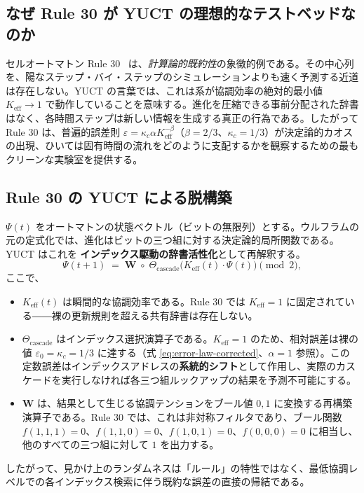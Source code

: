 \documentclass[11pt,a4paper]{article}
\newcommand{\Keff}{K_{\mathrm{eff}}}
\begin{document}
	\subsection{なぜ Rule 30 が YUCT の理想的なテストベッドなのか}
	セルオートマトン Rule 30~\cite{Wolfram2002} は、\textit{計算論的既約性}の象徴的例である。その中心列を、陽なステップ・バイ・ステップのシミュレーションよりも速く予測する近道は存在しない。YUCT の言葉では、これは系が協調効率の絶対的最小値 \(\Keff \to 1\) で動作していることを意味する。進化を圧縮できる事前分配された辞書はなく、各時間ステップは新しい情報を生成する真正の行為である。したがって Rule 30 は、普遍的誤差則 \(\varepsilon = \kappa_c \alpha \Keff^{-\beta}\)（\(\beta=2/3\)、\(\kappa_c=1/3\)）が決定論的カオスの出現、ひいては固有時間の流れをどのように支配するかを観察するための最もクリーンな実験室を提供する。
	
	\subsection{Rule 30 の YUCT による脱構築}
	\label{subsec:deconstruction}
	
	\(\Psi(t)\) をオートマトンの状態ベクトル（ビットの無限列）とする。ウルフラムの元の定式化では、進化はビットの三つ組に対する決定論的局所関数である。YUCT はこれを \textbf{インデックス駆動の辞書活性化}として再解釈する。
	\begin{equation}
		\Psi(t+1) \;=\; \mathbf{W}\;\circ\;
		\Theta_{\mathrm{cascade}}\!\bigl(\Keff(t)\cdot\Psi(t)\bigr)
		\pmod{2},
		\label{eq:rule30-ypsdc}
	\end{equation}
	ここで、
	\begin{itemize}
		\item \(\Keff(t)\) は瞬間的な協調効率である。Rule 30 では \(\Keff = 1\) に固定されている――裸の更新規則を超える共有辞書は存在しない。
		\item \(\Theta_{\mathrm{cascade}}\) はインデックス選択演算子である。\(\Keff=1\) のため、相対誤差は裸の値 \(\varepsilon_0 = \kappa_c = 1/3\) に達する（式 \eqref{eq:error-law-corrected}、\(\alpha=1\) 参照）。この定数誤差はインデックスアドレスの\textbf{系統的シフト}として作用し、実際のカスケードを実行しなければ各三つ組ルックアップの結果を予測不可能にする。
		\item \(\mathbf{W}\) は、結果として生じる協調テンションをブール値 \(0,1\) に変換する再構築演算子である。Rule 30 では、これは非対称フィルタであり、ブール関数 \(f(1,1,1)=0\)、\(f(1,1,0)=0\)、\(f(1,0,1)=0\)、\(f(0,0,0)=0\) に相当し、他のすべての三つ組に対して \(1\) を出力する。
	\end{itemize}
	したがって、見かけ上のランダムネスは「ルール」の特性ではなく、最低協調レベルでの各インデックス検索に伴う既約な誤差の直接の帰結である。
	
\end{document}
